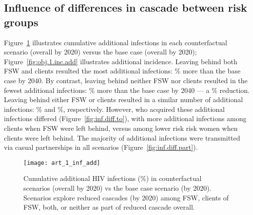 \subsection{Influence of differences in cascade between risk groups}\label{res.obj.1}
Figure~\ref{fig:obj.1.inf.add} illustrates cumulative additional infections
in each counterfactual scenario (\casmid overall by 2020) versus the base case (\cashigh overall by 2020);
Figure~\ref{fig:obj.1.inc.add} illustrates additional incidence.
Leaving behind both FSW and clients resulted the most additional infections:
\% more than the base case by 2040.
By contrast, leaving behind neither FSW nor clients resulted in the fewest additional infections:
\% more than the base case by 2040 ---
a \% reduction. %
Leaving behind either FSW or clients resulted in a similar number of additional infections:
\% and \%, respectively.
However, who acquired these additional infections differed (Figure~\ref{fig:inf.diff.to}),
with more additional infections among clients when FSW were left behind,
versus among lower risk risk women when clients were left behind.
The majority of additional infections were transmitted
via casual partnerships in all scenarios (Figure~\ref{fig:inf.diff.part}). %
\begin{figure}[h]
  \centering
  \texttt{[image: art\_1\_inf\_add]}
  \caption{Cumulative additional HIV infections (\%) in counterfactual scenarios (\casmid overall by 2020)
    vs the base case scenario (\cashigh by 2020).
    Scenarios explore reduced cascades (\caslow by 2020) among FSW, clients of FSW, both, or neither
    as part of reduced cascade overall.}
  \label{fig:obj.1.inf.add}
\end{figure}
